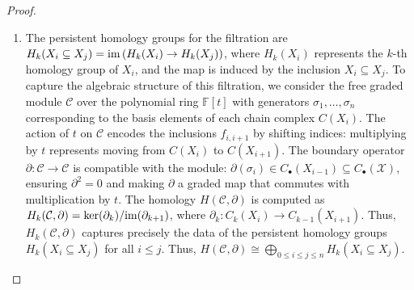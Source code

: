 \begin{proof}\noindent
\begin{enumerate}
\item The persistent homology groups for the filtration are $H_k(X_i \subseteq X_j) = \mathrm{im}\left( H_k(X_i) \to H_k(X_j) \right)$, where \( H_k(X_i) \) represents the \( k \)-th homology group of \( X_i \), and the map is induced by the inclusion \( X_i \subseteq X_j \). To capture the algebraic structure of this filtration, we consider the free graded module \( \mathcal{C} \) over the polynomial ring \( \mathbb{F}[t] \) with generators \( \sigma_1, \ldots, \sigma_n \) corresponding to the basis elements of each chain complex \( C(X_i) \). The action of \( t \) on \( \mathcal{C} \) encodes the inclusions \( f_{i,i+1} \) by shifting indices: multiplying by \( t \) represents moving from \( C(X_i) \) to \( C(X_{i+1}) \). The boundary operator \( \partial: \mathcal{C} \to \mathcal{C} \) is compatible with the module: $\partial(\sigma_i) \in C_{\bullet}(X_{i-1}) \subseteq C_{\bullet}(\mathcal{X})$, ensuring \( \partial^2 = 0 \) and making \( \partial \) a graded map that commutes with multiplication by \( t \). The homology \( H(\mathcal{C}, \partial) \) is computed as $H_k(\mathcal{C}, \partial) = \ker(\partial_k) / \mathrm{im}(\partial_{k+1})$, where \( \partial_k: C_k(X_i) \to C_{k-1}(X_{i+1}) \). Thus, \( H_k(\mathcal{C}, \partial) \) captures precisely the data of the persistent homology groups \( H_k(X_i \subseteq X_j) \) for all \( i \leq j \). Thus, $H(\mathcal{C}, \partial) \cong \bigoplus_{0 \leq i \leq j \leq n} H_k(X_i \subseteq X_j)$.

\end{enumerate}
\end{proof}
